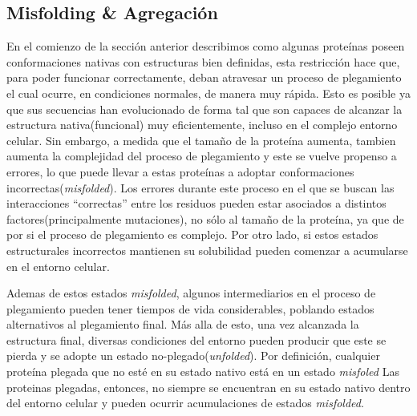 \subsection{Misfolding \& Agregación}



En el comienzo de la sección anterior describimos como algunas proteínas poseen conformaciones nativas con estructuras bien definidas,
esta restricción hace que, para poder funcionar correctamente, deban atravesar un proceso de plegamiento el cual ocurre, en condiciones normales, de manera muy rápida. 
Esto es posible ya que sus secuencias han evolucionado de forma tal que son capaces de alcanzar la estructura nativa(funcional) muy eficientemente, incluso en el complejo entorno celular.
Sin embargo, a medida que el tamaño de la proteína aumenta, tambien aumenta la complejidad del proceso de plegamiento y este se vuelve propenso a errores,
lo que puede llevar a estas proteínas a adoptar conformaciones incorrectas(\textit{misfolded}). 
Los errores durante este proceso en el que se buscan las interacciones ``correctas'' entre los residuos pueden estar asociados a distintos factores(principalmente mutaciones), 
no sólo al tamaño de la proteína, ya que de por si el proceso de plegamiento es complejo. 
Por otro lado, si estos estados estructurales incorrectos mantienen su solubilidad pueden comenzar a acumularse en el entorno celular.


Ademas de estos estados \textit{misfolded}, algunos intermediarios en el proceso de plegamiento pueden tener tiempos de vida considerables, poblando estados alternativos al plegamiento final.
Más alla de esto, una vez alcanzada la estructura final, diversas condiciones del entorno pueden producir que este se pierda y se adopte un estado no-plegado(\textit{unfolded}).
Por definición, cualquier proteína plegada que no esté en su estado nativo está en un estado \textit{misfoled}
Las proteinas plegadas, entonces, no siempre se encuentran en su estado nativo dentro del entorno celular y pueden ocurrir acumulaciones de estados \textit{misfolded}.

